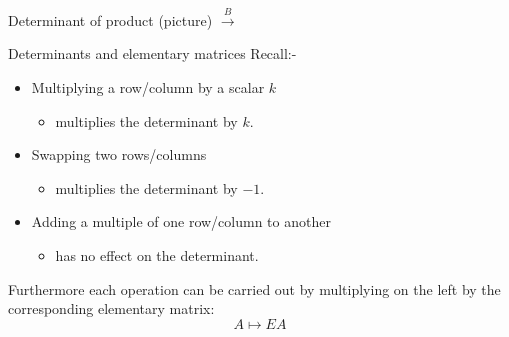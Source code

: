 \documentclass{beamer}
\begin{document}
\begin{frame}{Determinant of product (picture)}
  $\xrightarrow{B}$
\end{frame}

\begin{frame}{Determinants and elementary matrices}
  Recall:-\vfill
  \begin{itemize}
  \item Multiplying a row/column by a scalar $k$
    \begin{itemize}
    \item multiplies the determinant by $k$.
    \end{itemize}\vfill
  \item Swapping two rows/columns
    \begin{itemize}
    \item multiplies the determinant by $-1$.
    \end{itemize}\vfill
  \item Adding a multiple of one row/column to another
    \begin{itemize}
    \item has no effect on the determinant.
    \end{itemize}
  \end{itemize}\vfill
  Furthermore each operation can be carried out by multiplying on the left by the corresponding elementary matrix:
  \begin{equation*}
    A \mapsto EA
  \end{equation*}
\end{frame}
\end{document}
